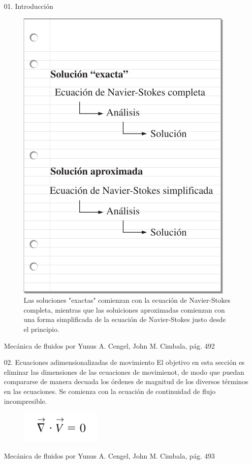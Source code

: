 \begin{frame}{01. Introducción}
\justifying
\begin{figure}[H]
\centering
\includegraphics[scale=0.2]{Section_Files/S3-imagenes-Jhon/0002.png}
\caption{Las soluciones "exactas" comienzan con la ecuación de Navier-Stokes completa, mientras que las soluiciones aproximadas comienzan con una forma simplificada de la ecuación de Navier-Stokes justo desde el principio.}
\end{figure}

{\tiny Mecánica de fluidos por Yunus A. Cengel, John M. Cimbala, pág. 492}
\end{frame}


\begin{frame}{02. Ecuaciones adimensionalizadas de movimiento}
\justifying
El objetivo en esta sección es eliminar las dimensiones de las ecuaciones de movimienot, de modo que puedan compararse de manera decuada los órdenes de magnitud de los diversos términos en las ecuaciones. Se comienza con la ecuación de continuidad de flujo incompresible.
\begin{figure}[H]
\centering
\includegraphics[scale=0.2]{Section_Files/S3-imagenes-Jhon/0004.png}
\end{figure}

{\tiny Mecánica de fluidos por Yunus A. Cengel, John M. Cimbala, pág. 493}
\end{frame}

